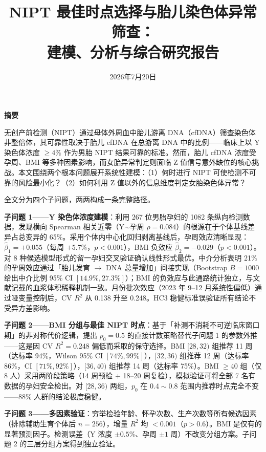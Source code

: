 \documentclass{mcm-paper}
\title{NIPT 最佳时点选择与胎儿染色体异常筛查：\\建模、分析与综合研究报告}
\date{2026年7月20日}
\begin{document}
\maketitle

\begin{center}
{\Large\bfseries 摘\quad 要}
\end{center}

\vspace{0.5em}

无创产前检测（NIPT）通过母体外周血中胎儿游离 DNA（cfDNA）筛查染色体非整倍体，其可靠性取决于胎儿 cfDNA 在总游离 DNA 中的比例——临床上以 Y 染色体浓度 $\geq 4\%$ 作为男胎 NIPT 结果可靠的标准。然而，胎儿 cfDNA 浓度受孕周、BMI 等多种因素影响，而女胎异常判定则面临 Z 值信号意外缺位的核心挑战。本文围绕两个根本问题展开系统性建模：（1）何时进行 NIPT 可使检测不可靠的风险最小化？（2）如何利用 Z 值以外的信息维度判定女胎染色体异常？

全文分为四个子问题，两两构成一条完整路径。

\textbf{子问题 1——Y 染色体浓度建模}：利用 267 位男胎孕妇的 1082 条纵向检测数据，发现横向 Spearman 相关近零（Y$\sim$孕周 $\rho=0.084$）的根源在于个体基线差异占总变异的 65\%。采用个体内中心化回归剥离基线后，孕周效应清晰显现：$\hat{\beta}_1=+0.055$（每周 $+5.7\%$，$p<0.001$），BMI 负效应 $\hat{\beta}_2=-0.029$（$p<0.001$）。对 8 种候选模型形式的留一孕妇交叉验证确认线性形式最优。中介分析表明 21\% 的孕周效应通过「胎儿发育 $\to$ DNA 总量增加」间接实现（Bootstrap $B=1000$ 给出中介比例 95\% CI $[14.9\%, 27.3\%]$）；BMI 的负效应与此通路统计独立，与文献记载的血浆体积稀释机制一致。月份批次效应（2023 年 9--12 月系统性偏低）通过哑变量控制后，CV $R^2$ 从 0.138 升至 0.248。HC3 稳健标准误验证所有结论不受异方差影响。

\textbf{子问题 2——BMI 分组与最佳 NIPT 时点}：基于「补测不消耗不可逆临床窗口期」的非对称代价逻辑，提出 $p_0=0.5$ 的直接计数策略替代子问题 1 的参数外推——这是因 CV $R^2=0.248$ 偏低而采取的保守选择。BMI $[28,32)$ 组推荐 11 周（达标率 94\%，Wilson 95\% CI $[74\%,99\%]$），$[32,36)$ 组推荐 12 周（达标率 86\%，CI $[71\%,92\%]$），$[36,40)$ 组推荐 14 周（达标率 75\%）。BMI $\geq 40$ 组（仅 8 人）采用两阶段策略（14 周预检 $+$ 18--20 周复检），模拟验证可将全部 7 名有数据的孕妇安全检出。对 $[28,36)$ 两组，$p_0$ 在 $0.4\sim0.8$ 范围内推荐时点完全不变——88\% 人群的结论极度稳健。

\textbf{子问题 3——多因素验证}：穷举检验年龄、怀孕次数、生产次数等所有候选因素（排除辅助生育个体后 $n=256$），增量 $R^2$ 均 $<0.001$（$p>0.6$）。BMI 是仅有的显著预测因子。检测误差（Y 浓度 $\pm 0.5\%$、孕周 $\pm 1$ 周）不改变分组方案。子问题 2 的三层分组方案得到独立验证。
\end{document}
